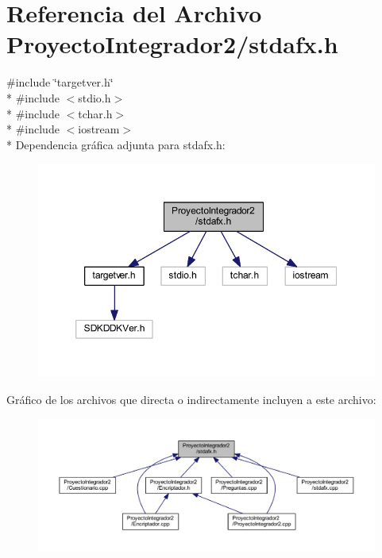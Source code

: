\section{Referencia del Archivo Proyecto\-Integrador2/stdafx.h}
\label{stdafx_8h}
{\ttfamily \#include \char`\"{}targetver.\-h\char`\"{}}\\*
{\ttfamily \#include $<$stdio.\-h$>$}\\*
{\ttfamily \#include $<$tchar.\-h$>$}\\*
{\ttfamily \#include $<$iostream$>$}\\*
Dependencia gráfica adjunta para stdafx.\-h\-:
\nopagebreak
\begin{figure}[H]
\begin{center}
\leavevmode
\includegraphics[width=350pt]{stdafx_8h__incl}
\end{center}
\end{figure}
Gráfico de los archivos que directa o indirectamente incluyen a este archivo\-:
\nopagebreak
\begin{figure}[H]
\begin{center}
\leavevmode
\includegraphics[width=350pt]{stdafx_8h__dep__incl}
\end{center}
\end{figure}

